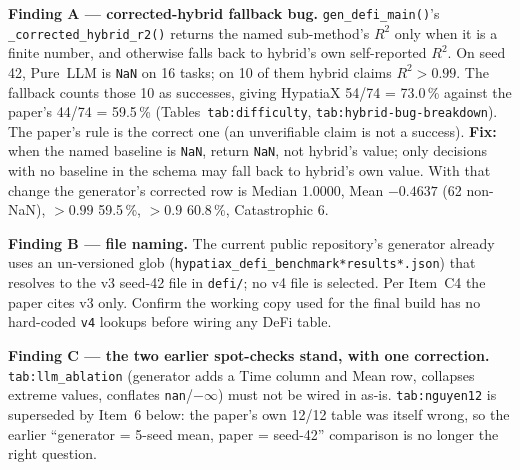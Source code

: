 \documentclass[11pt]{article}
\begin{document}
\textbf{Finding A --- corrected-hybrid fallback bug.}
\texttt{gen\_defi\_main()}'s \texttt{\_corrected\_hybrid\_r2()} returns the
named sub-method's $R^2$ only when it is a finite number, and otherwise
falls back to hybrid's own self-reported $R^2$. On seed 42, Pure~LLM is
\texttt{NaN} on 16 tasks; on 10 of them hybrid claims $R^2>0.99$. The
fallback counts those 10 as successes, giving HypatiaX 54/74 = 73.0\,\%
against the paper's 44/74 = 59.5\,\% (Tables~\texttt{tab:difficulty},
\texttt{tab:hybrid-bug-breakdown}). The paper's rule is the correct one
(an unverifiable claim is not a success). \textbf{Fix:} when the named
baseline is \texttt{NaN}, return \texttt{NaN}, not hybrid's value; only
decisions with no baseline in the schema may fall back to hybrid's own
value. With that change the generator's corrected row is
Median 1.0000, Mean $-0.4637$ (62 non-NaN), $>0.99$ 59.5\,\%,
$>0.9$ 60.8\,\%, Catastrophic 6.

\textbf{Finding B --- file naming.} The current public repository's
generator already uses an un-versioned glob
(\texttt{hypatiax\_defi\_benchmark*results*.json}) that resolves to the
v3 seed-42 file in \texttt{defi/}; no v4 file is selected. Per Item~C4
the paper cites v3 only. Confirm the working copy used for the final
build has no hard-coded \texttt{v4} lookups before wiring any DeFi table.

\textbf{Finding C --- the two earlier spot-checks stand, with one correction.}
\texttt{tab:llm\_ablation} (generator adds a Time column and Mean row, collapses
extreme values, conflates \texttt{nan}/$-\infty$) must not be wired in as-is.
\texttt{tab:nguyen12} is superseded by Item~6 below: the paper's own 12/12
table was itself wrong, so the earlier ``generator = 5-seed mean, paper =
seed-42'' comparison is no longer the right question.
\end{document}
